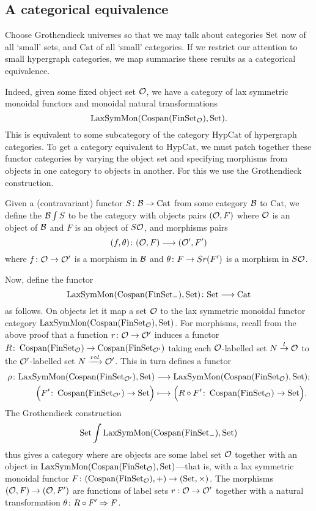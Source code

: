 \subsection{A categorical equivalence}

Choose Grothendieck universes so that we may talk about categories $\mathrm{Set}$ now of
all `small' sets, and $\mathrm{Cat}$ of all `small' categories. If we restrict
our attention to small hypergraph categories, we map summarise these results as a categorical equivalence. 

Indeed, given some fixed object set $\mathcal O$, we have a category of lax symmetric
monoidal functors and monoidal natural transformations
\[
  \mathrm{LaxSymMon}(\operatorname{{Cospan}}(\mathrm{FinSet}_{\mathcal O}),\mathrm{Set}).
\]
This is equivalent to some subcategory of the category $\mathrm{HypCat}$ of
hypergraph categories. To get a category equivalent to $\mathrm{HypCat}$, we
must patch together these functor categories by varying the object set and
specifying morphisms from objects in one category to objects in another. For
this we use the Grothendieck construction. 

Given a (contravariant) functor $S{\colon} \mathcal B \to \mathrm{Cat}$ from some
category $\mathcal B$ to $\mathrm{Cat}$, we define the  $\mathcal B \int S$ to be the category with objects pairs
$(\mathcal O,F)$ where $\mathcal O$ is an object of $\mathcal B$ and $F$ is an object of $S\mathcal
O$, and morphisms pairs 
\[
  (f,\theta){\colon} (\mathcal O,F) \longrightarrow (\mathcal O',F')
\]
where $f{\colon} \mathcal O \to \mathcal O'$ is a morphism in $\mathcal B$ and $\theta{\colon} F \to
Sr(F')$ is a morphism in $S\mathcal O$.

Now, define the functor 
\[
  \mathrm{LaxSymMon}(\operatorname{{Cospan}}(\mathrm{FinSet}_{-}), \mathrm{Set}){\colon} \mathrm{Set} \longrightarrow
  \mathrm{Cat}
\]
as follows. On objects let it map a set $\mathcal O$ to the lax symmetric monoidal
functor category $\mathrm{LaxSymMon}(\operatorname{{Cospan}}(\mathrm{FinSet}_{\mathcal O}), \mathrm{Set})$. For
morphisms, recall from the above proof that a function $r{\colon} \mathcal O \to \mathcal O'$
induces a functor $R{\colon} \operatorname{{Cospan}}(\mathrm{FinSet}_{\mathcal O}) \to \operatorname{{Cospan}}(\mathrm{FinSet}_{\mathcal
O'})$ taking each $\mathcal O$-labelled set $N \stackrel{l}\to \mathcal O$ to the $\mathcal
O'$-labelled set $N \xrightarrow{r \circ l} \mathcal O'$. This in turn defines a
functor 
\begin{align*}
  \rho{\colon} \mathrm{LaxSymMon}(\operatorname{{Cospan}}(\mathrm{FinSet}_{\mathcal O'}), \mathrm{Set}) &\longrightarrow
\mathrm{LaxSymMon}(\operatorname{{Cospan}}(\mathrm{FinSet}_{\mathcal O}), \mathrm{Set}); \\
\Big(F'{\colon}
\operatorname{{Cospan}}(\mathrm{FinSet}_{\mathcal O'}) \to \mathrm{Set}\Big) &\longmapsto \Big(R\circ F'{\colon}  \operatorname{{Cospan}}(\mathrm{FinSet}_{\mathcal O})
\to \mathrm{Set}\Big).
\end{align*}
The Grothendieck construction 
\[
 \mathrm{Set}\int \mathrm{LaxSymMon}(\operatorname{{Cospan}}(\mathrm{FinSet}_{-}), \mathrm{Set})
\]
thus gives a category where are objects are some label set $\mathcal O$ together with
an object in $\mathrm{LaxSymMon}(\operatorname{{Cospan}}(\mathrm{FinSet}_{\mathcal O}), \mathrm{Set})$---that is,
with a lax symmetric monoidal functor $F{\colon} (\operatorname{{Cospan}}(\mathrm{FinSet}_{\mathcal O}),+) \to
(\mathrm{Set},\times)$. The morphisms $(\mathcal O, F) \to (\mathcal O,F')$ are functions of label
sets $r: \mathcal O \to \mathcal O'$ together with a natural transformation $\theta{\colon}
R \circ F'\Rightarrow F$.


